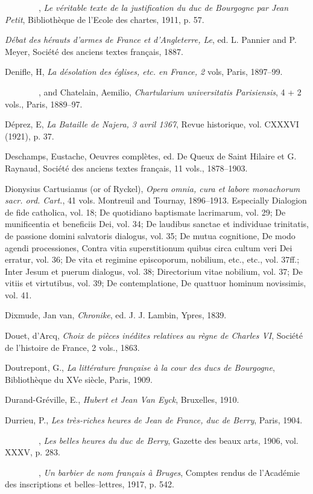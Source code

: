 {~~~~~~~~}, \emph{Le véritable texte de la justification du duc de
Bourgogne par Jean Petit}, Bibliothèque de l'Ecole des chartes, 1911, p.
57.

\emph{Débat des hérauts d'armes de France et d'Angleterre, Le}, ed. L.
Pannier and P. Meyer, Société des anciens textes français, 1887.

Denifle, H, \emph{La désolation des églises, etc. en France, 2} vols,
Paris, 1897--99.

{~~~~~~~~}, and Chatelain, Aemilio, \emph{Chartularium universitatis
Parisiensis}, 4 + 2 vols., Paris, 1889--97.

Déprez, E, \emph{La Bataille de Najera, 3 avril 1367}, Revue historique,
vol. CXXXVI (1921), p. 37.

Deschamps, Eustache, Oeuvres complètes, ed. De Queux de Saint Hilaire et
G. Raynaud, Société des anciens textes français, 11 vols., 1878--1903.

Dionysius Cartusianus (or of Ryckel), \emph{Opera omnia, cura et labore
monachorum sacr. ord. Cart.}, 41 vols. Montreuil and Tournay,
1896--1913. Especially Dialogion de fide catholica, vol. 18; De
quotidiano baptismate lacrimarum, vol. 29; De munificentia et beneficiis
Dei, vol. 34; De laudibus sanctae et individuae trinitatis, de passione
domini salvatoris dialogus, vol. 35; De mutua cognitione, De modo agendi
processiones, Contra vitia superstitionum quibus circa cultum veri Dei
erratur, vol. 36; De vita et regimine episcoporum, nobilium, etc., etc.,
vol. 37ff.; Inter Jesum et puerum dialogus, vol. 38; Directorium vitae
nobilium, vol. 37; De vitiis et virtutibus, vol. 39; De contemplatione,
De quattuor hominum novissimis, vol. 41.

Dixmude, Jan van, \emph{Chronike}, ed. J. J. Lambin, Ypres, 1839.

Douet, d'Arcq, \emph{Choix de pièces inédites relatives au règne de
Charles VI}, Société de l'histoire de France, 2 vols., 1863.

Doutrepont, G., \emph{La littérature française à la cour des ducs de
Bourgogne}, Bibliothèque du XVe siècle, Paris, 1909.

Durand-Gréville, E., \emph{Hubert et Jean Van Eyck}, Bruxelles, 1910.

Durrieu, P., \emph{Les très-riches heures de Jean de France, duc de
Berry}, Paris, 1904.

{~~~~~~~~}, \emph{Les belles heures du duc de Berry}, Gazette des beaux
arts, 1906, vol. XXXV, p. 283.

{~~~~~~~~}, \emph{Un barbier de nom français à Bruges}, Comptes rendus
de l'Académie des inscriptions et belles--lettres, 1917, p. 542.

